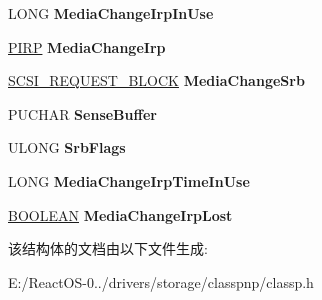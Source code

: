 \begin{DoxyCompactItemize}
\begin{tabbing}
\end{tabbing}\item 
\mbox{\label{struct___m_e_d_i_a___c_h_a_n_g_e___d_e_t_e_c_t_i_o_n___i_n_f_o_abaf9183f74c0a77f3c59f22da1470a91}} 
L\+O\+NG {\bfseries Media\+Change\+Irp\+In\+Use}
\item 
\mbox{\label{struct___m_e_d_i_a___c_h_a_n_g_e___d_e_t_e_c_t_i_o_n___i_n_f_o_adfcb9751dcf32903f896aabee42c842c}} 
\hyperlink{interfacevoid}{P\+I\+RP} {\bfseries Media\+Change\+Irp}
\item 
\mbox{\label{struct___m_e_d_i_a___c_h_a_n_g_e___d_e_t_e_c_t_i_o_n___i_n_f_o_af7d478671ca9b231cf417fd7a2a5b0f4}} 
\hyperlink{struct___s_c_s_i___r_e_q_u_e_s_t___b_l_o_c_k}{S\+C\+S\+I\+\_\+\+R\+E\+Q\+U\+E\+S\+T\+\_\+\+B\+L\+O\+CK} {\bfseries Media\+Change\+Srb}
\item 
\mbox{\label{struct___m_e_d_i_a___c_h_a_n_g_e___d_e_t_e_c_t_i_o_n___i_n_f_o_a52bc4301e4ba9061bdcfe6b02af429aa}} 
P\+U\+C\+H\+AR {\bfseries Sense\+Buffer}
\item 
\mbox{\label{struct___m_e_d_i_a___c_h_a_n_g_e___d_e_t_e_c_t_i_o_n___i_n_f_o_a89a4c405a908133f17395751d48ef7f6}} 
U\+L\+O\+NG {\bfseries Srb\+Flags}
\item 
\mbox{\label{struct___m_e_d_i_a___c_h_a_n_g_e___d_e_t_e_c_t_i_o_n___i_n_f_o_a8e103413a89b188c3a83a51be7ce25b9}} 
L\+O\+NG {\bfseries Media\+Change\+Irp\+Time\+In\+Use}
\item 
\mbox{\label{struct___m_e_d_i_a___c_h_a_n_g_e___d_e_t_e_c_t_i_o_n___i_n_f_o_a97326a0ab96c336d69d0ebe37645b94b}} 
\hyperlink{_processor_bind_8h_a112e3146cb38b6ee95e64d85842e380a}{B\+O\+O\+L\+E\+AN} {\bfseries Media\+Change\+Irp\+Lost}
\end{DoxyCompactItemize}


该结构体的文档由以下文件生成\+:\begin{DoxyCompactItemize}
\item 
E\+:/\+React\+O\+S-\/0../drivers/storage/classpnp/classp.\+h\end{DoxyCompactItemize}
